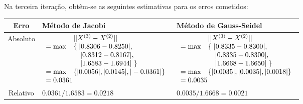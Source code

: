 \documentclass[12pt,a4paper]{article}
\begin{document}
\begin{ExerciseList}
\begin{center}
\begin{tabular}{cc}
\end{tabular}
\end{center}
\medskip
Na terceira iteração, obtêm-se as seguintes estimativas para os erros cometidos:
\medskip
\begin{center}
\begin{tabular}{|c|p{7.1cm}|p{7.1cm}|}
\hline
\textbf{Erro}
&
\textbf{Método de Jacobi}
&
\textbf{Método de Gauss-Seidel}\\\hline
Absoluto
&
$\begin{array}{lll}
       & ||X^{(3)} - X^{(2)}|| \\
= \max & \left\{\right. |0.8306-0.8250|, \\
       & \quad |0.8312-0.8167|, \\
       & \quad |1.6583-1.6944| \left.\right\} \\
= \max & \left\{ |0.0056|, |0.0145|, |-0.0361| \right\} \\
= 0.0361\hspace{-1cm} & 
\end{array}$
&
$\begin{array}{lll}
       & ||X^{(3)} - X^{(2)}|| \\
= \max & \left\{\right. |0.8335-0.8300|, \\
       & \quad |0.8335-0.8300|, \\
       & \quad |1.6668-1.6650| \left.\right\} \\
= \max & \left\{ |0.0035|, |0.0035|, |0.0018| \right\} \\
= 0.0035\hspace{-1cm} & 
\end{array}$
\\\hline
Relativo
&
$0.0361/1.6583 = 0.0218$
&
$0.0035/1.6668 = 0.0021$
\\\hline
\end{tabular}
\end{center}


\end{ExerciseList}
\end{document}
